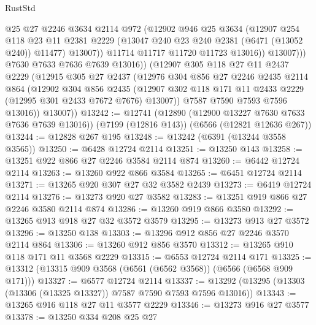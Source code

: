 \begin{lexlean}{RustStd}
\begin{coremodule}
{\begin{coremodule}
{{{{{{{{{{{{{{{{{{{{{{{{{{                    @25
                    @27
                    @2246
                    @3634
                    @2114
                    @972
                    (@12902
                      @946
                      @25
                      @3634
                      (@12907
                        @254
                        @118
                        @23
                        @11
                        @2381
                        @2229
                        (@13047 @240 @23 @240 @2381 (@6471 (@13052 @240)) @11477)
                        @13007))
                    @11714
                    @11717
                    @11720
                    @11723
                    @13016))
                @13007)))
          @7630
          @7633
          @7636
          @7639
          @13016))
      (@12907
        @305
        @118
        @27
        @11
        @2437
        @2229
        (@12915
          @305
          @27
          @2437
          (@12976
            @304
            @856
            @27
            @2246
            @2435
            @2114
            @864
            (@12902
              @304
              @856
              @2435
              (@12907 @302 @118 @171 @11 @2433 @2229 (@12995 @301 @2433 @7672 @7676) @13007))
            @7587
            @7590
            @7593
            @7596
            @13016))
        @13007))
@13242 := @12741
    (@12890 (@12900 @13227 @7630 @7633 @7636 @7639 @13016))
    (@7199 (@12816 @143))
    (@6566 (@12821 @12636 @267))
@13244 := @12828 @267 @195
@13248 := @13242 (@6391 (@13244 @3558 @3565))
@13250 := @6428 @12724 @2114
@13251 := @13250 @143
@13258 := @13251 @922 @866 @27 @2246 @3584 @2114 @874
@13260 := @6442 @12724 @2114
@13263 := @13260 @922 @866 @3584
@13265 := @6451 @12724 @2114
@13271 := @13265 @920 @307 @27 @32 @3582 @2439
@13273 := @6419 @12724 @2114
@13276 := @13273 @920 @27 @3582
@13283 := @13251 @919 @866 @27 @2246 @3580 @2114 @874
@13286 := @13260 @919 @866 @3580
@13292 := @13265 @913 @918 @27 @32 @3572 @3579
@13295 := @13273 @913 @27 @3572
@13296 := @13250 @138
@13303 := @13296 @912 @856 @27 @2246 @3570 @2114 @864
@13306 := @13260 @912 @856 @3570
@13312 := @13265 @910 @118 @171 @11 @3568 @2229
@13315 := @6553 @12724 @2114 @171
@13325 := @13312 (@13315 @909 @3568 (@6561 (@6562 @3568)) (@6566 (@6568 @909 @171)))
@13327 := @6577 @12724 @2114
@13337 := @13292 (@13295 (@13303 (@13306 (@13325 @13327)) @7587 @7590 @7593 @7596 @13016))
@13343 := @13265 @916 @118 @27 @11 @3577 @2229
@13346 := @13273 @916 @27 @3577
@13378 := @13250
    @334
    @208
    @25
    @27
}}}}}}}}}}}}}}}}}}}}}}}}}}
\end{coremodule}}
\end{coremodule}
\end{lexlean}
